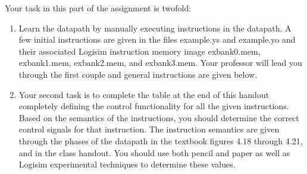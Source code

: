 \documentclass[11pt]{article}
\begin{document}

Your task in this part of the assignment is twofold:
\begin{enumerate}
\item Learn the datapath by manually executing instructions in the datapath.  A few initial instructions are given in the files example.ys and example.yo and their associated Logisim instruction memory image exbank0.mem, exbank1.mem, exbank2.mem, and exbank3.mem.  Your professor will lead you through the first couple and general instructions are given below.
\item Your second task is to complete the table at the end of this handout completely defining the control functionality for all the given instructions.  Based on the semantics of the instructions, you should determine the correct control signals for that instruction.  The instruction semantics are given through the phases of the datapath in the textbook figures 4.18 through 4.21, and in the class handout.  You should use both pencil and paper as well as Logisim experimental techniques to determine these values.
\end{enumerate}
\end{document}
